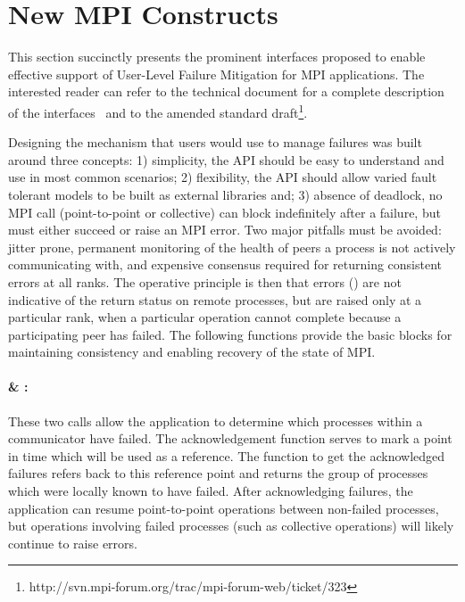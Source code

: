 \section{New MPI Constructs}
\label{sect:newmpi}

This section succinctly presents the prominent interfaces proposed
to enable effective support of User-Level Failure Mitigation for MPI
applications. The interested reader can refer to the technical document
for a complete description of the interfaces~\cite{BlandULFMTechReport}
and to the amended standard draft\footnote{http://svn.mpi-forum.org/trac/mpi-forum-web/ticket/323}.

Designing the mechanism that users would use to manage failures was built around
three concepts: 1) simplicity, the API should be easy to understand
and use in most common scenarios; 2) flexibility, the API should allow
varied fault tolerant models to be built as external libraries and; 3) absence
of deadlock, no MPI call (point-to-point or collective) can block
indefinitely after a failure, but must either succeed or raise an MPI error.
Two major pitfalls must be avoided: jitter prone, permanent 
monitoring of the health of peers a process is not actively
communicating with, and expensive consensus required for returning
consistent errors at all ranks. The operative principle is then that
errors () are not indicative of the
return status on remote processes, but are raised only at a particular
rank, when a particular operation cannot complete because a participating 
peer has failed. The following functions 
provide the basic blocks for maintaining consistency and enabling 
recovery of the state of MPI.

\paragraph{ \& :}\label{sect.ack}

These two calls allow the application to determine which processes within a
communicator have failed. The acknowledgement function serves to mark a point in
time which will be used as a reference. The function to get the acknowledged
failures refers back to this reference point and returns the group of processes
which were locally known to have failed.
After acknowledging failures, the application can resume
 point-to-point
operations between non-failed processes, but operations involving failed
processes (such as collective operations) will likely continue to raise errors.

